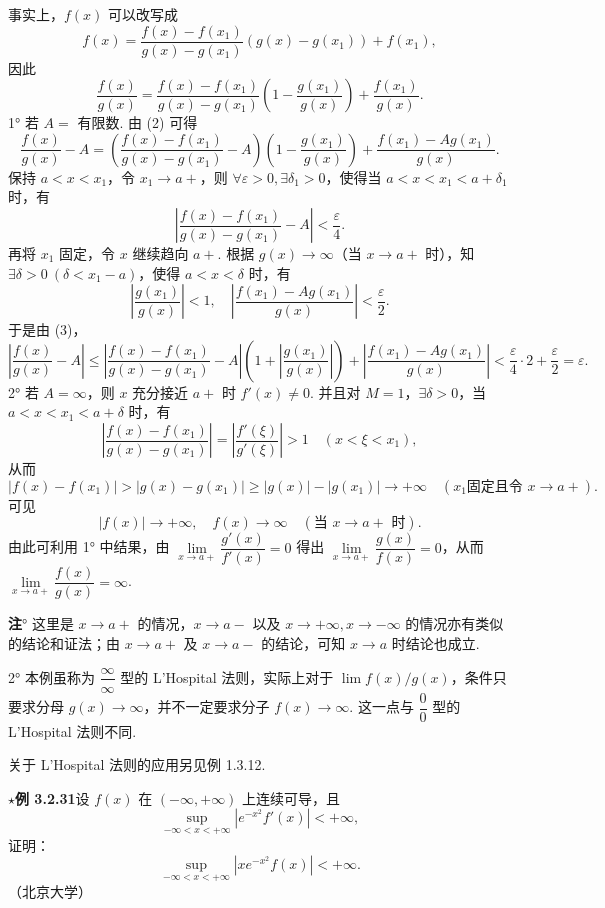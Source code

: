 \documentclass[UTF8, 12pt, fontset=fandol, oneside]{ctexart}
\begin{document}
事实上，$f(x)$ 可以改写成
\[
  f(x)=\frac{f(x)-f(x_1)}{g(x)-g(x_1)}(g(x)-g(x_1))+f(x_1),
\]
因此
\begin{equation}
  \frac{f(x)}{g(x)}
  =
  \frac{f(x)-f(x_1)}{g(x)-g(x_1)}
  \left(1-\frac{g(x_1)}{g(x)}\right)
  +\frac{f(x_1)}{g(x)}.
\tag{2}
\end{equation}
1° 若 $A=$ 有限数. 由 (2) 可得
\begin{equation}
  \frac{f(x)}{g(x)}-A
  =
  \left(\frac{f(x)-f(x_1)}{g(x)-g(x_1)}-A\right)
  \left(1-\frac{g(x_1)}{g(x)}\right)
  +\frac{f(x_1)-Ag(x_1)}{g(x)}.
\tag{3}
\end{equation}
保持 $a<x<x_1$，令 $x_1\to a+$，则 $\forall\varepsilon>0,\exists\delta_1>0$，使得当 $a<x<x_1<a+\delta_1$ 时，有
\[
  \left|\frac{f(x)-f(x_1)}{g(x)-g(x_1)}-A\right|<\frac{\varepsilon}{4}.
\]
再将 $x_1$ 固定，令 $x$ 继续趋向 $a+$. 根据 $g(x)\to\infty$（当 $x\to a+$ 时），知 $\exists\delta>0\ (\delta<x_1-a)$，使得 $a<x<\delta$ 时，有
\[
  \left|\frac{g(x_1)}{g(x)}\right|<1,\quad
  \left|\frac{f(x_1)-Ag(x_1)}{g(x)}\right|<\frac{\varepsilon}{2}.
\]
于是由 (3)，
\[
  \left|\frac{f(x)}{g(x)}-A\right|
  \le
  \left|\frac{f(x)-f(x_1)}{g(x)-g(x_1)}-A\right|
  \left(1+\left|\frac{g(x_1)}{g(x)}\right|\right)
  +\left|\frac{f(x_1)-Ag(x_1)}{g(x)}\right|
  <\frac{\varepsilon}{4}\cdot2+\frac{\varepsilon}{2}=\varepsilon.
\]
2° 若 $A=\infty$，则 $x$ 充分接近 $a+$ 时 $f'(x)\ne0$. 并且对 $M=1$，$\exists\delta>0$，当 $a<x<x_1<a+\delta$ 时，有
\[
  \left|\frac{f(x)-f(x_1)}{g(x)-g(x_1)}\right|
  =
  \left|\frac{f'(\xi)}{g'(\xi)}\right|>1
  \quad(x<\xi<x_1),
\]
从而
\[
  |f(x)-f(x_1)|>|g(x)-g(x_1)|\ge |g(x)|-|g(x_1)|\to+\infty
  \quad(x_1\text{固定且令 }x\to a+).
\]
可见
\[
  |f(x)|\to+\infty,\quad f(x)\to\infty\quad(\text{当 }x\to a+\text{ 时}).
\]
由此可利用 1° 中结果，由 $\lim\limits_{x\to a+}\dfrac{g'(x)}{f'(x)}=0$ 得出 $\lim\limits_{x\to a+}\dfrac{g(x)}{f(x)}=0$，从而 $\lim\limits_{x\to a+}\dfrac{f(x)}{g(x)}=\infty$.

\noindent\textbf{注}° 这里是 $x\to a+$ 的情况，$x\to a-$ 以及 $x\to+\infty,x\to-\infty$ 的情况亦有类似的结论和证法；由 $x\to a+$ 及 $x\to a-$ 的结论，可知 $x\to a$ 时结论也成立.

2° 本例虽称为 $\dfrac{\infty}{\infty}$ 型的 L'Hospital 法则，实际上对于 $\lim f(x)/g(x)$，条件只要求分母 $g(x)\to\infty$，并不一定要求分子 $f(x)\to\infty$. 这一点与 $\dfrac{0}{0}$ 型的 L'Hospital 法则不同.

关于 L'Hospital 法则的应用另见例 1.3.12.

\noindent\textbf{$\star$例 3.2.31}\quad 设 $f(x)$ 在 $(-\infty,+\infty)$ 上连续可导，且
\[
  \sup_{-\infty<x<+\infty}|e^{-x^2}f'(x)|<+\infty,
\]
证明：
\[
  \sup_{-\infty<x<+\infty}|xe^{-x^2}f(x)|<+\infty.
\]
（北京大学）
\end{document}
